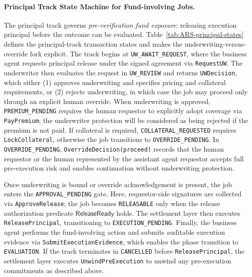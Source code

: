 \documentclass{article} %
\begin{document}
\paragraph{Principal Track State Machine for Fund-involving Jobs.}
The principal track governs \emph{pre-verification fund exposure}: releasing execution principal before the outcome can be evaluated. Table~\ref{tab:ARS-principal-states} defines the principal-track transaction states and makes the underwriting-versus-override fork explicit. The track begins at \texttt{UW\_AWAIT\_REQUEST}, where the business agent requests principal release under the signed agreement via \texttt{RequestUW}. The underwriter then evaluates the request in \texttt{UW\_REVIEW} and returns \texttt{UWDecision}, which either (1) approves underwriting and specifies pricing and collateral requirements, or (2) rejects underwriting, in which case the job may proceed only through an explicit human override. When underwriting is approved, \texttt{PREMIUM\_PENDING} requires the human requestor to explicitly adopt coverage via \texttt{PayPremium}; the underwriter protection will be considered as being rejected if the premium is not paid. If collateral is required, \texttt{COLLATERAL\_REQUESTED} requires \texttt{LockCollateral}, otherwise the job transitions to \texttt{OVERRIDE\_PENDING}. In \texttt{OVERRIDE\_PENDING}, \texttt{OverrideDecision(proceed)} records that the human requestor or the human represented by the assistant agent requestor accepts full pre-execution risk and enables continuation without underwriting protection. 

Once underwriting is bound or override acknowledgement is present, the job enters the \texttt{APPROVAL\_PENDING} gate. Here, requestor-side signatures are collected via \texttt{ApproveRelease}; the job becomes \texttt{RELEASABLE} only when the release authorization predicate $\mathsf{ReleaseReady}$ holds. The settlement layer then executes \texttt{ReleasePrincipal}, transitioning to \texttt{EXECUTION\_PENDING}. Finally, the business agent performs the fund-involving action and submits auditable execution evidence via \texttt{SubmitExecutionEvidence}, which enables the phase transition to \texttt{EVALUATION}. If the track terminates in \texttt{CANCELLED} before \texttt{ReleasePrincipal}, the settlement layer executes \texttt{UnwindPreExecution} to unwind any pre-execution commitments as described above.
\end{document}

